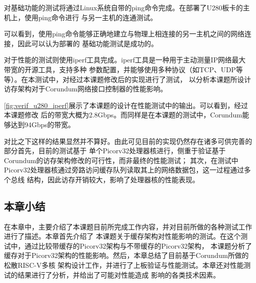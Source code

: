 
对基础功能的测试将通过Linux系统自带的ping命令完成。在部署了U280板卡的主机上，使用ping命令进行
与另一主机的连通测试。


可以看到，使用ping命令能够正确地建立与物理上相连接的另一主机之间的网络连接，因此可以认为部署的
基础功能测试是成功的。


对于性能的测试则使用iperf工具完成。iperf工具是一种用于主动测量IP网络最大带宽的开源工具，支持多种
参数配置，并能够使用多种协议（如TCP、UDP等等）。在本测试中，对经过本课题修改后的实现进行了测试，
以分析本课题所设计访存架构对于Corundum网络接口控制器的性能影响。

\autoref{fig:verif_u280_iperf}展示了本课题的设计在性能测试中的输出。可以看到，经过本课题修改
后的带宽大概为2.8Gbps。而同样是在本课题的测试中，Corundum能够达到94Gbps的带宽。


对比之下这样的结果显然并不算好。由此可见目前的实现仍然存在诸多可供完善的部分首先，目前的测试基于
单个Picorv32处理器核进行，侧重于验证基于Corundum的访存架构修改的可行性，而非最终的性能测试；
其次，在测试中Picorv32处理器核通过旁路访问缓存队列读取其上的网络数据包，这一过程通过多个总线
结构，因此访存开销较大，影响了处理器核的性能表现。

\subsection{本章小结}

在本章中，主要介绍了本课题目前所完成工作内容，并对目前所做的各种测试工作进行了描述。本章首先介绍了
本课题关于缓存架构对性能影响的测试。在这个测试中，通过比较带缓存的Picorv32架构与不带缓存的Picorv32架构，
本课题分析了缓存对于Picorv32架构的性能影响。然后，本章总结了目前基于Corundum所做的松散RISC-V多核
架构设计工作，并进行了上板验证与性能测试。本章还对性能测试的结果进行了分析，并给出了可能对性能造成
影响的各类技术因素。
